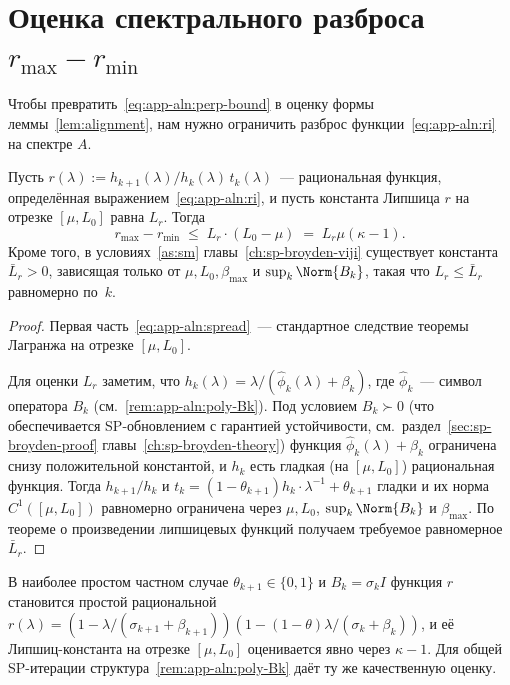 \section{Оценка спектрального разброса \texorpdfstring{$r_{\max} - r_{\min}$}{rmax-rmin}}
\label{sec:app-aln:spread}

Чтобы превратить~\eqref{eq:app-aln:perp-bound} в оценку формы леммы~\ref{lem:alignment},
нам нужно ограничить разброс функции~\eqref{eq:app-aln:ri} на спектре $A$.

\begin{lemma}
\label{lem:app-aln:r-spread}
Пусть $r(\lambda) := h_{k+1}(\lambda)/h_k(\lambda)\,t_k(\lambda)$~---
рациональная функция, определённая выражением~\eqref{eq:app-aln:ri}, и пусть
константа Липшица $r$ на отрезке $[\mu, L_0]$ равна $L_r$. Тогда
\begin{equation}
r_{\max} - r_{\min} \;\le\; L_r \cdot (L_0 - \mu) \;=\; L_r \mu (\kappa - 1).
\label{eq:app-aln:spread}
\end{equation}
Кроме того, в условиях~\ref{as:sm} главы~\ref{ch:sp-broyden-viji} существует
константа $\bar L_r > 0$, зависящая только от $\mu, L_0, \beta_{\max}$ и
$\sup_k \Norm{B_k}$, такая что $L_r \le \bar L_r$ равномерно по~$k$.
\end{lemma}

\begin{proof}
Первая часть~\eqref{eq:app-aln:spread}~--- стандартное следствие теоремы
Лагранжа на отрезке $[\mu, L_0]$.

Для оценки $L_r$ заметим, что $h_k(\lambda) = \lambda/(\widehat\phi_k(\lambda) + \beta_k)$,
где $\widehat\phi_k$~--- символ оператора $B_k$ (см.~\eqref{rem:app-aln:poly-Bk}).
Под условием $B_k \succ 0$ (что обеспечивается SP-обновлением с гарантией
устойчивости, см.~раздел~\ref{sec:sp-broyden-proof} главы~\ref{ch:sp-broyden-theory})
функция $\widehat\phi_k(\lambda) + \beta_k$ ограничена снизу положительной
константой, и $h_k$ есть гладкая (на $[\mu, L_0]$) рациональная функция.
Тогда $h_{k+1}/h_k$ и $t_k = (1-\theta_{k+1}) h_k\cdot \lambda^{-1} + \theta_{k+1}$
гладки и их норма $C^{1}([\mu, L_0])$ равномерно ограничена через
$\mu, L_0$, $\sup_k \Norm{B_k}$ и $\beta_{\max}$. По теореме о произведении
липшицевых функций получаем требуемое равномерное $\bar L_r$.
\end{proof}

\begin{remark}
\label{rem:app-aln:Lr-kappa}
В наиболее простом частном случае $\theta_{k+1} \in \{0, 1\}$ и
$B_k = \sigma_k I$ функция $r$ становится простой рациональной
$r(\lambda) = (1 - \lambda/(\sigma_{k+1} + \beta_{k+1}))(1 - (1-\theta) \lambda/(\sigma_k + \beta_k))$,
и её Липшиц-константа на отрезке $[\mu, L_0]$ оценивается явно через $\kappa - 1$.
Для общей SP-итерации структура~\eqref{rem:app-aln:poly-Bk} даёт ту же
качественную оценку.
\end{remark}

